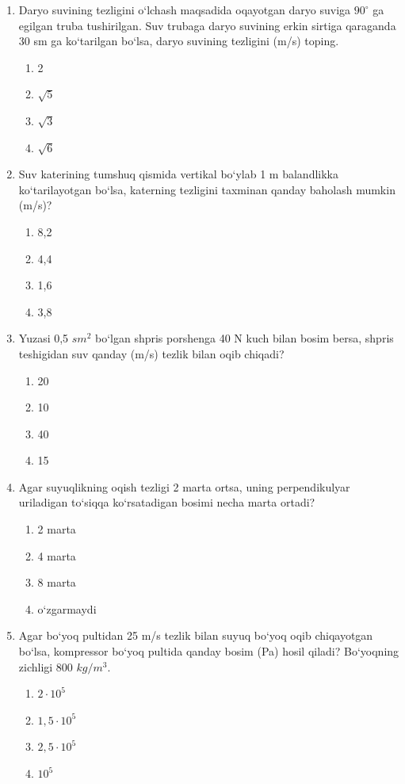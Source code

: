 \begin{enumerate}
\item Daryo suvining tezligini o‘lchash maqsadida oqayotgan daryo suviga $90^\circ$ ga egilgan truba tushirilgan. Suv trubaga daryo suvining erkin sirtiga qaraganda 30 sm ga ko‘tarilgan bo‘lsa, daryo suvining tezligini (m/s) toping.
\begin{enumerate}[label=\Alph*)]
\item 2
\item $\sqrt{5}$
\item $\sqrt{3}$
\item $\sqrt{6}$
\end{enumerate}

\item Suv katerining tumshuq qismida vertikal bo‘ylab 1 m balandlikka ko‘tarilayotgan bo‘lsa, katerning tezligini taxminan qanday baholash mumkin (m/s)?
\begin{enumerate}[label=\Alph*)]
\item 8,2
\item 4,4
\item 1,6
\item 3,8
\end{enumerate}

\item Yuzasi 0,5 $sm^2$ bo‘lgan shpris porshenga 40 N kuch bilan bosim bersa, shpris teshigidan suv qanday (m/s) tezlik bilan oqib chiqadi?
\begin{enumerate}[label=\Alph*)]
\item 20
\item 10
\item 40
\item 15
\end{enumerate}

\item Agar suyuqlikning oqish tezligi 2 marta ortsa, uning perpendikulyar uriladigan to‘siqqa ko‘rsatadigan bosimi necha marta ortadi?
\begin{enumerate}[label=\Alph*)]
\item 2 marta
\item 4 marta
\item 8 marta
\item o‘zgarmaydi
\end{enumerate}

\item Agar bo‘yoq pultidan 25 m/s tezlik bilan suyuq bo‘yoq oqib chiqayotgan bo‘lsa, kompressor bo‘yoq pultida qanday bosim (Pa) hosil qiladi? Bo‘yoqning zichligi 800 $kg/m^3$.
\begin{enumerate}[label=\Alph*)]
\item $2 \cdot 10^5$
\item $1,5 \cdot 10^5$
\item $2,5 \cdot 10^5$
\item $10^5$
\end{enumerate}


\end{enumerate}
